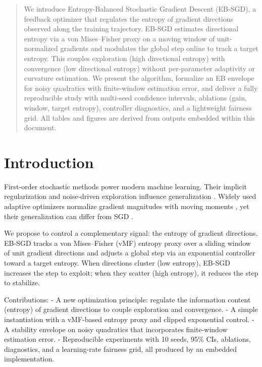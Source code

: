 \begin{abstract}
We introduce Entropy-Balanced Stochastic Gradient Descent (EB-SGD), a feedback optimizer that regulates the entropy of gradient directions observed along the training trajectory. EB-SGD estimates directional entropy via a von Mises--Fisher proxy on a moving window of unit-normalized gradients and modulates the global step online to track a target entropy. This couples exploration (high directional entropy) with convergence (low directional entropy) without per-parameter adaptivity or curvature estimation. We present the algorithm, formalize an EB envelope for noisy quadratics with finite-window estimation error, and deliver a fully reproducible study with multi-seed confidence intervals, ablations (gain, window, target entropy), controller diagnostics, and a lightweight fairness grid. All tables and figures are derived from outputs embedded within this document.
\end{abstract}

\section{Introduction}
First-order stochastic methods power modern machine learning. Their implicit regularization and noise-driven exploration influence generalization \cite{Smith2018BayesianSGDICLR,Keskar2017LargeBatchICLR,Wilson2017MarginalValueNeurIPS}. Widely used adaptive optimizers normalize gradient magnitudes with moving moments \cite{Duchi2011AdagradJMLR,Kingma2015AdamICLR,Reddi2018AdamConvergenceICLR,Luo2019AdaBoundICLR,Liu2020RAdamICLR,Zhuang2020AdaBeliefNeurIPS,Loshchilov2019AdamWICLR}, yet their generalization can differ from SGD \cite{Wilson2017MarginalValueNeurIPS,Foret2021SAMICLR}.

We propose to control a complementary signal: the entropy of gradient directions. EB-SGD tracks a von Mises--Fisher (vMF) entropy proxy over a sliding window of unit gradient directions and adjusts a global step via an exponential controller toward a target entropy. When directions cluster (low entropy), EB-SGD increases the step to exploit; when they scatter (high entropy), it reduces the step to stabilize.

Contributions:
- A new optimization principle: regulate the information content (entropy) of gradient directions to couple exploration and convergence.
- A simple instantiation with a vMF-based entropy proxy and clipped exponential control.
- A stability envelope on noisy quadratics that incorporates finite-window estimation error.
- Reproducible experiments with 10 seeds, 95\% CIs, ablations, diagnostics, and a learning-rate fairness grid, all produced by an embedded implementation.

